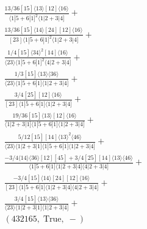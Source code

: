 \documentclass[varwidth, border=5pt]{standalone}
\begin{document}
\begin{my}
$\begin{gathered}
\scriptscriptstyle\frac{13/36[15]⟨13⟩[12]⟨16⟩}{⟨1|5+6|1]^2⟨1|2+3|4]}+\\
\scriptscriptstyle\frac{13/36[15]⟨14⟩[24][12]⟨16⟩}{[23]⟨1|5+6|1]^2⟨1|2+3|4]}+\\
\scriptscriptstyle\frac{1/4[15]⟨34⟩^2[14]⟨16⟩}{⟨23⟩⟨1|5+6|1]^2⟨4|2+3|4]}+\\
\scriptscriptstyle\frac{1/3[15]⟨13⟩⟨36⟩}{⟨23⟩⟨1|5+6|1]⟨1|2+3|4]}+\\
\scriptscriptstyle\frac{3/4[25][12]⟨16⟩}{[23]⟨1|5+6|1]⟨1|2+3|4]}+\\
\scriptscriptstyle\frac{19/36[15]⟨13⟩[12]⟨16⟩}{⟨1|2+3|1]⟨1|5+6|1]⟨1|2+3|4]}+\\
\scriptscriptstyle\frac{5/12[15][14]⟨13⟩^2⟨46⟩}{⟨23⟩⟨1|2+3|1]⟨1|5+6|1]⟨1|2+3|4]}+\\
\scriptscriptstyle\frac{-3/4⟨14⟩⟨36⟩[12][45]+3/4[25][14]⟨13⟩⟨46⟩}{⟨1|5+6|1]⟨1|2+3|4]⟨4|2+3|4]}+\\
\scriptscriptstyle\frac{-3/4[15]⟨14⟩[24][12]⟨16⟩}{[23]⟨1|5+6|1]⟨1|2+3|4]⟨4|2+3|4]}+\\
\scriptscriptstyle\frac{3/4[15]⟨13⟩⟨36⟩}{⟨23⟩⟨1|2+3|1]⟨1|2+3|4]}+\\
\scriptscriptstyle(432165,\;\text{True},\;-)\phantom{+}
\end{gathered}$
\end{my}
\end{document}
